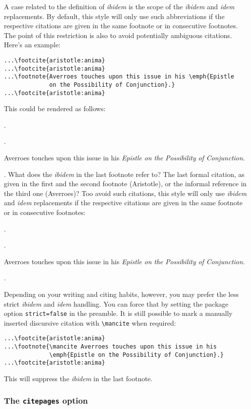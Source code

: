 \documentclass[a4paper]{article}
\newcommand*{\cmd}[1]{\texttt{\textbackslash #1}}
\newenvironment*{pseudofootnotes}
  {\list\labelenumi{%
     \def\makelabel##1{\hss\llap{##1}}%
     \def\labelenumi{\theenumi}%
     \usecounter{enumi}%
     \setlength{\leftmargin}{0pt}%
     \setlength{\labelsep}{0.75em}%
     \setlength{\itemsep}{0pt}%
     \setlength{\parsep}{0pt}}%
   \citereset
   \footnotesize
   \def\footcite##1{\item\Cite{##1}.}%
   \def\footnote##1{\item##1}}
  {\endlist}
\newenvironment*{pseudofootnotes*}
  {\pseudofootnotes
   \def\footnote##1{\item##1\mancite}}
  {\endpseudofootnotes}
\begin{document}
A case related to the definition of \emph{ibidem} is the scope of
the \emph{ibidem} and \emph{idem} replacements. By default, this
style will only use such abbreviations if the respective citations
are given in the same footnote or in consecutive footnotes. The
point of this restriction is also to avoid potentially ambiguous
citations. Here's an example:

\begin{verbatim}
...\footcite{aristotle:anima}
...\footcite{aristotle:anima}
...\footnote{Averroes touches upon this issue in his \emph{Epistle
             on the Possibility of Conjunction}.}
...\footcite{aristotle:anima}
\end{verbatim}
%
This could be rendered as follows:

\begin{pseudofootnotes}
\footcite{aristotle:anima}
\footcite{aristotle:anima}
\footnote{Averroes touches upon this issue in his \emph{Epistle on
the Possibility of Conjunction}.}
\footcite{aristotle:anima}
\end{pseudofootnotes}
%
What does the \emph{ibidem} in the last footnote refer to? The last
formal citation, as given in the first and the second footnote
(Aristotle), or the informal reference in the third one (Averroes)?
Too avoid such citations, this style will only use \emph{ibidem} and
\emph{idem} replacements if the respective citations are given in
the same footnote or in consecutive footnotes:

\begin{pseudofootnotes*}
\footcite{aristotle:anima}
\footcite{aristotle:anima}
\footnote{Averroes touches upon this issue in his \emph{Epistle on
the Possibility of Conjunction}.}
\footcite{aristotle:anima}
\end{pseudofootnotes*}
%
Depending on your writing and citing habits, however, you may prefer
the less strict \emph{ibidem} and \emph{idem} handling. You can
force that by setting the package option \texttt{strict=false} in
the preamble. It is still possible to mark a manually inserted
discursive citation with \cmd{mancite} when required:

\begin{verbatim}
...\footcite{aristotle:anima}
...\footnote{\mancite Averroes touches upon this issue in his
             \emph{Epistle on the Possibility of Conjunction}.}
...\footcite{aristotle:anima}
\end{verbatim}
%
This will suppress the \emph{ibidem} in the last footnote.

\subsubsection*{The \texttt{citepages} option}
\end{document}
